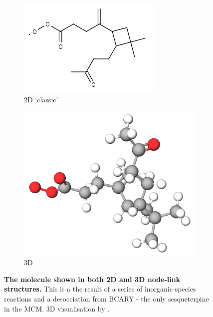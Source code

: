 \begin{figure}[H]
    \centering
    \begin{subfigure}[b]{0.34\textwidth}
        \centering
        \includegraphics[width=\textwidth]{C141CO3.png}
        \caption{2D `classic'}
    \end{subfigure}
    \begin{subfigure}[b]{0.34\textwidth}
        \centering
        \includegraphics[width=\textwidth]{C141CO33d.png}
        \caption{3D}
    \end{subfigure}
       \caption{\textbf{The molecule  shown in both 2D and 3D node-link structures.} This is a the result of a series of inorganic species reactions and a desocciation from BCARY - the only sesqueterpine in the MCM.  3D visualisation by \citep{mol3d}. }
       \label{fig:mol}
\end{figure}




